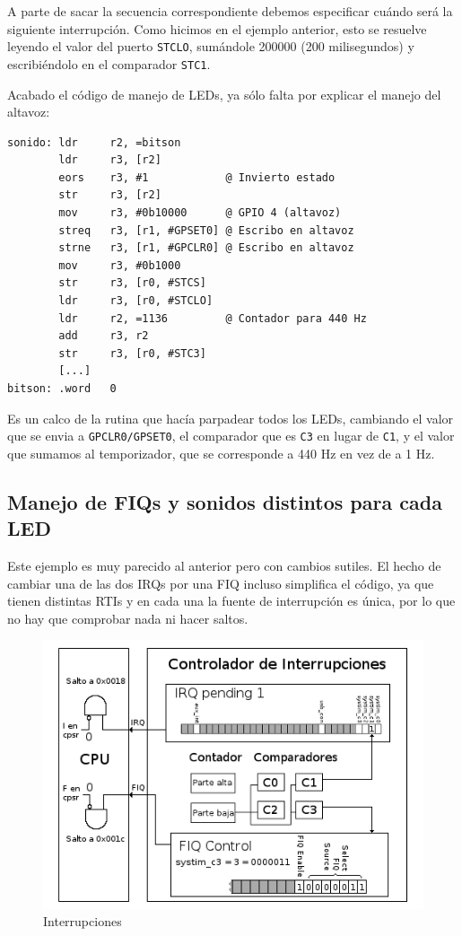 A parte de sacar la secuencia correspondiente debemos especificar cuándo será la siguiente
interrupción. Como hicimos en el ejemplo anterior, esto se resuelve leyendo el valor del
puerto {\tt STCLO}, sumándole 200000 (200 milisegundos) y escribiéndolo en el comparador
{\tt STC1}.

Acabado el código de manejo de LEDs, ya sólo falta por explicar el manejo del altavoz:

\begin{lstlisting}
sonido: ldr     r2, =bitson
        ldr     r3, [r2]
        eors    r3, #1            @ Invierto estado
        str     r3, [r2]
        mov     r3, #0b10000      @ GPIO 4 (altavoz)
        streq   r3, [r1, #GPSET0] @ Escribo en altavoz
        strne   r3, [r1, #GPCLR0] @ Escribo en altavoz
        mov     r3, #0b1000
        str     r3, [r0, #STCS]
        ldr     r3, [r0, #STCLO]
        ldr     r2, =1136         @ Contador para 440 Hz
        add     r3, r2
        str     r3, [r0, #STC3]
        [...]
bitson: .word   0
\end{lstlisting}

Es un calco de la rutina que hacía parpadear todos los LEDs, cambiando
el valor que se envia a {\tt GPCLR0/GPSET0}, el comparador que es {\tt C3} en lugar de {\tt C1},
y el valor que sumamos al temporizador, que se corresponde a 440 Hz en vez de a 1 Hz.

\subsection{Manejo de FIQs y sonidos distintos para cada LED}

Este ejemplo es muy parecido al anterior pero con cambios sutiles. El hecho de cambiar una de
las dos IRQs por una FIQ incluso simplifica el código, ya que tienen distintas RTIs y en cada
una la fuente de interrupción es única, por lo que no hay que comprobar nada ni hacer saltos.

\begin{figure}[h]
  \centering
    \includegraphics[width=12cm]{graphs/inter5.png}
  \caption{Interrupciones}
  \label{fig:inter5}
\end{figure}

